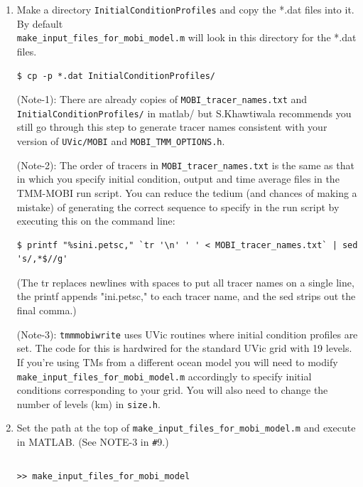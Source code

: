 \documentclass[a4paper]{article}
\def\noin{\noindent }
\begin{document}
\begin{enumerate}
\item Make a directory \verb|InitialConditionProfiles| and copy the *.dat files into it. By default \\ \verb|make_input_files_for_mobi_model.m| will look in this directory for the *.dat files.
\begin{lstlisting}[style=DOS]
 $ cp -p *.dat InitialConditionProfiles/
\end{lstlisting}

\noin (Note-1): There are already copies of \verb|MOBI_tracer_names.txt| and \verb|InitialConditionProfiles/| in matlab/ but S.Khawtiwala recommends you still go through this step to generate tracer names consistent with your version of \verb|UVic/MOBI| and \verb|MOBI_TMM_OPTIONS.h|.

\noin (Note-2): The order of tracers in \verb|MOBI_tracer_names.txt| is the same as that in which you specify initial condition, output and time average files in the TMM-MOBI run script. You can reduce the tedium (and chances of making a mistake) of generating the correct sequence to specify in the run script by executing this on the command line: 
\begin{lstlisting}[style=DOS]
 $ printf "%sini.petsc," `tr '\n' ' ' < MOBI_tracer_names.txt` | sed 's/,*$//g'
\end{lstlisting}
(The tr replaces newlines with spaces to put all tracer names on a single line, 
the printf appends "ini.petsc," to each tracer name, and the sed strips out the 
final comma.)

\noin (Note-3): \verb|tmmmobiwrite| uses UVic routines where initial condition profiles are set. The code for this is hardwired for the standard UVic grid with 19 levels. If you're using TMs from a different ocean model you will need to modify \verb|make_input_files_for_mobi_model.m| accordingly to specify initial conditions corresponding to your grid. You will also need to change the number of levels (km) in \verb|size.h|.

\item Set the path at the top of \verb|make_input_files_for_mobi_model.m| and execute in MATLAB. (See NOTE-3 in \verb|#|9.)
\lstset{language=matlab} 
\begin{lstlisting}[frame=single,basicstyle=\scriptsize,commentstyle=\color{blue}]
 % make_input_files_for_mobi_model.m
\end{lstlisting}
\begin{lstlisting}[style=DOS]
 >> make_input_files_for_mobi_model
\end{lstlisting}


\end{enumerate}
\end{document}
